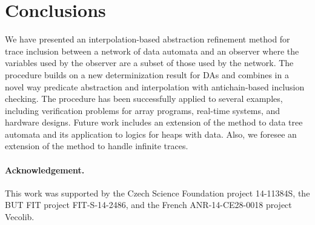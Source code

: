 \documentclass{llncs}
\begin{document}
\section{Conclusions}


We have presented an interpolation-based abstraction refinement method
for trace inclusion between a network of data automata and an
observer where the variables used by the observer are a subset of
those used by the network. The procedure builds on a new
determinization result for DAs and combines in a novel way predicate
abstraction and interpolation with antichain-based inclusion checking.
The procedure has been successfully applied to several examples,
including verification problems for array programs, real-time systems,
and hardware designs. Future work includes an extension of the method
to data tree automata and its application to logics for heaps with
data. Also, we foresee an extension of the method to handle infinite
traces.

\paragraph{Acknowledgement.} This work was supported by the Czech Science
Foundation project 14-11384S, the BUT FIT project FIT-S-14-2486, and the French
ANR-14-CE28-0018 project Vecolib.



\end{document}
